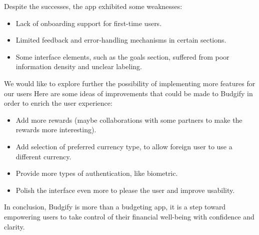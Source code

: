 \documentclass[a4paper,12pt]{article}
\begin{document}
Despite the successes, the app exhibited some weaknesses:
\begin{itemize}
    \item Lack of onboarding support for first-time users.
    \item Limited feedback and error-handling mechanisms in certain sections.
    \item Some interface elements, such as the goals section, suffered from poor information density and unclear labeling.
\end{itemize}
We would like to explore further the possibility of implementing more features for our users Here are some ideas of improvements that could be made to Budgify in order to enrich the user experience:
\begin{itemize}
    \item Add more rewards (maybe collaborations with some partners to make the rewards more interesting).
    \item Add selection of preferred currency type, to allow foreign user to use a different currency.
    \item Provide more types of authentication, like biometric.
    \item Polish the interface even more to please the user and improve usability.
\end{itemize}
In conclusion, Budgify is more than a budgeting app, it is a step toward empowering users to take control of their financial well-being with confidence and clarity.
\end{document}
